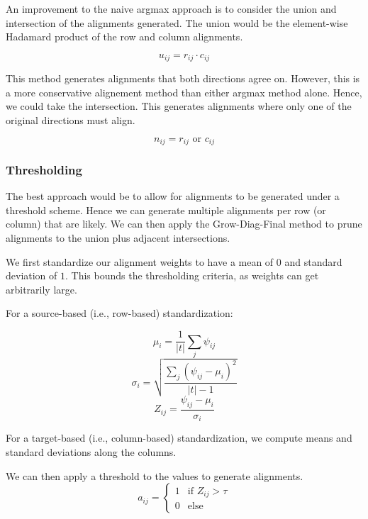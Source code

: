 \documentclass[twoside,twocolumn]{article}
\begin{document}
An improvement to the naive argmax approach is to consider the union and
intersection of the alignments generated. The union would
be the element-wise Hadamard product of the row and column alignments.

\begin{equation}
  u_{ij} = r_{ij} \cdot c_{ij}
\end{equation}

This method generates alignments that both directions agree on.
However, this is a more conservative alignement method than either
argmax method alone. Hence, we could take the intersection.
This generates alignments where only one of the original directions must align.

\begin{equation}
  n_{ij} = r_{ij} \text{ or } c_{ij}
\end{equation}


\subsubsection{Thresholding}

The best approach would be to allow for alignments to be generated under a
threshold scheme. Hence we can generate multiple alignments per row (or column)
that are likely. We can then apply the Grow-Diag-Final method to prune
alignments to the union plus adjacent intersections.


We first standardize our alignment weights to have a mean of $0$ and standard
deviation of $1$. This bounds the thresholding criteria, as weights can get
arbitrarily large.

For a source-based (i.e., row-based) standardization:

\begin{equation}
  \mu_{i} = \frac{1}{|t|} \sum_j \psi_{ij}
\end{equation}
\begin{equation}
  \sigma_{i} = \sqrt{\frac{\sum_j \left( \psi_{ij} - \mu_i \right)^2}{|t|-1}}
\end{equation}
\begin{equation}
  Z_{ij} = \frac{\psi_{ij} - \mu_i}{\sigma_i}
\end{equation}

For a target-based (i.e., column-based) standardization, we compute means and
standard deviations along the columns.

We can then apply a threshold to the values to generate alignments.
\begin{equation}
  a_{ij} = \begin{cases}
    1 & \text{if } Z_{ij} > \tau \\
    0 & \text{else}
  \end{cases}
\end{equation}
\end{document}
